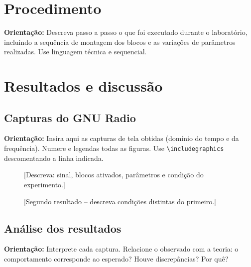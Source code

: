 \documentclass[12pt,a4paper]{article}
\newcommand{\dica}[1]{%
  \par\vspace{0.3em}%
  \noindent\colorbox{gray!15}{\parbox{0.97\linewidth}{\small\textbf{Orientação:} #1}}%
  \par\vspace{0.3em}%
}
\begin{document}
\section{Procedimento}
\dica{Descreva passo a passo o que foi executado durante o laboratório,
incluindo a sequência de montagem dos blocos e as variações de parâmetros
realizadas. Use linguagem técnica e sequencial.}

\vspace{6cm}

\section{Resultados e discussão}

\subsection{Capturas do GNU Radio}
\dica{Insira aqui as capturas de tela obtidas (domínio do tempo e da
frequência). Numere e legendas todas as figuras. Use
\texttt{\textbackslash includegraphics} descomentando a linha indicada.}

\begin{figure}[H]
  \centering
  \caption{[Descreva: sinal, blocos ativados, parâmetros e condição do
  experimento.]}
\end{figure}

\begin{figure}[H]
  \centering
  \caption{[Segundo resultado -- descreva condições distintas do primeiro.]}
\end{figure}

\subsection{Análise dos resultados}
\dica{Interprete cada captura. Relacione o observado com a teoria: o
comportamento corresponde ao esperado? Houve discrepâncias? Por quê?}
\end{document}
